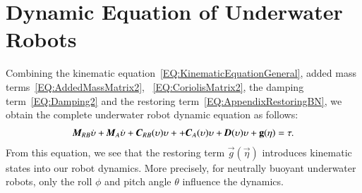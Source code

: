 \section{Dynamic Equation of Underwater Robots}
Combining the kinematic equation~\ref{EQ:KinematicEquationGeneral}, added mass terms~\ref{EQ:AddedMassMatrix2},
~\ref{EQ:CoriolisMatrix2}, the damping term~\ref{EQ:Damping2} and the restoring term~\ref{EQ:AppendixRestoringBN}, we obtain the complete underwater robot dynamic equation as follows:
\begin{align}
\emph{\textbf{M}}_{RB}\dot{\vec{\upsilon}}+\emph{\textbf{M}}_{A}\dot{\vec{\upsilon}}
+\emph{\textbf{C}}_{RB}(\vec{\upsilon})\vec{\upsilon}+
+\emph{\textbf{C}}_{A}(\vec{\upsilon})\vec{\upsilon}
+\emph{\textbf{D}}(\vec{\upsilon})\vec{\upsilon}+
\vec{g}(\vec{\eta})=\vec{\tau}.\label{EQ:DynamicsGeneral}
\end{align}
From this equation, we see that the restoring term $\vec{g}(\vec{\eta})$ introduces kinematic states into our robot dynamics. More precisely, for neutrally buoyant underwater robots, only the roll $\phi$ and pitch angle $\theta$ influence the dynamics.
 
